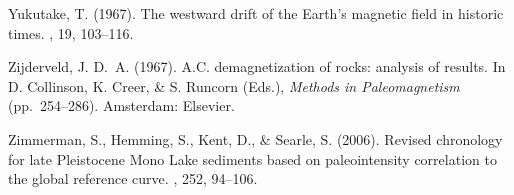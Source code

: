 Yukutake, T. (1967).
\newblock The westward drift of the Earth's magnetic field in historic times.
, 19, 103--116.

Zijderveld, J. D.~A. (1967).
\newblock A.C. demagnetization of rocks: analysis of results.
\newblock In D. Collinson, K. Creer, \& S. Runcorn (Eds.), {\em Methods in
  Paleomagnetism}  (pp.\ 254--286). Amsterdam: Elsevier.

Zimmerman, S., Hemming, S., Kent, D., \& Searle, S. (2006).
\newblock Revised chronology for late Pleistocene Mono Lake sediments based on
  paleointensity correlation to the global reference curve.
, 252, 94--106.

